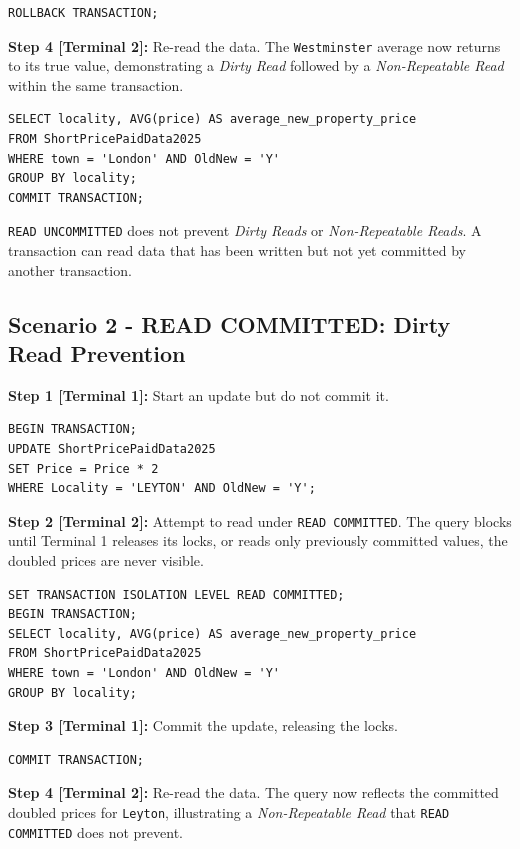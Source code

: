 \documentclass[a4paper,11pt]{article}
\begin{document}
\begin{lstlisting}
ROLLBACK TRANSACTION;
\end{lstlisting}

\textbf{Step 4 [Terminal 2]:} Re-read the data. The \texttt{Westminster} average now returns to its true value, demonstrating a \textit{Dirty Read} followed by a \textit{Non-Repeatable Read} within the same transaction.

\begin{lstlisting}
SELECT locality, AVG(price) AS average_new_property_price
FROM ShortPricePaidData2025
WHERE town = 'London' AND OldNew = 'Y'
GROUP BY locality;
COMMIT TRANSACTION;
\end{lstlisting}

\texttt{READ UNCOMMITTED} does not prevent \textit{Dirty Reads} or \textit{Non-Repeatable Reads}. A transaction can read data that has been written but not yet committed by another transaction.

\subsection{Scenario 2 - READ COMMITTED: Dirty Read Prevention}

\textbf{Step 1 [Terminal 1]:} Start an update but do not commit it.

\begin{lstlisting}
BEGIN TRANSACTION;
UPDATE ShortPricePaidData2025
SET Price = Price * 2
WHERE Locality = 'LEYTON' AND OldNew = 'Y';
\end{lstlisting}

\textbf{Step 2 [Terminal 2]:} Attempt to read under \texttt{READ COMMITTED}. The query blocks until Terminal 1 releases its locks, or reads only previously committed values, the doubled prices are never visible.

\begin{lstlisting}
SET TRANSACTION ISOLATION LEVEL READ COMMITTED;
BEGIN TRANSACTION;
SELECT locality, AVG(price) AS average_new_property_price
FROM ShortPricePaidData2025
WHERE town = 'London' AND OldNew = 'Y'
GROUP BY locality;
\end{lstlisting}

\textbf{Step 3 [Terminal 1]:} Commit the update, releasing the locks.

\begin{lstlisting}
COMMIT TRANSACTION;
\end{lstlisting}

\textbf{Step 4 [Terminal 2]:} Re-read the data. The query now reflects the committed doubled prices for \texttt{Leyton}, illustrating a \textit{Non-Repeatable Read} that \texttt{READ COMMITTED} does not prevent.
\end{document}
